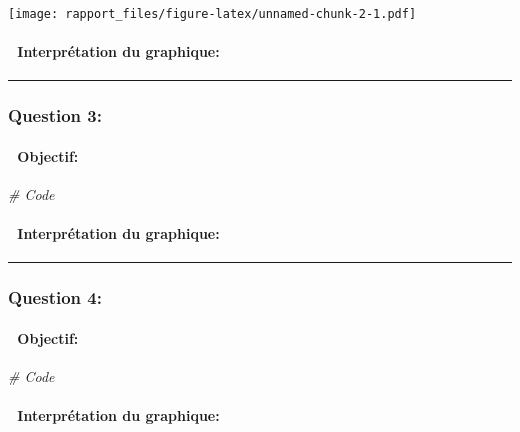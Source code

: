 \documentclass[
]{article}
\newenvironment{Shaded}{\begin{snugshade}}{\end{snugshade}}
\newcommand{\CommentTok}[1]{\textcolor[rgb]{0.56,0.35,0.01}{\textit{#1}}}
\begin{document}
\texttt{[image: rapport\_files/figure-latex/unnamed-chunk-2-1.pdf]}

\paragraph{🧠 Interprétation du
graphique:}\label{interpruxe9tation-du-graphique-1}

\begin{center}\rule{0.5\linewidth}{0.5pt}\end{center}

\subsubsection{\texorpdfstring{\textbf{Question
3:}}{Question 3:}}\label{question-3}

\paragraph{🎯 Objectif:}\label{objectif-2}

\begin{Shaded}
\begin{Highlighting}[]
\CommentTok{\# Code}
\end{Highlighting}
\end{Shaded}

\paragraph{🧠 Interprétation du
graphique:}\label{interpruxe9tation-du-graphique-2}

\begin{center}\rule{0.5\linewidth}{0.5pt}\end{center}

\subsubsection{\texorpdfstring{\textbf{Question
4:}}{Question 4:}}\label{question-4}

\paragraph{🎯 Objectif:}\label{objectif-3}

\begin{Shaded}
\begin{Highlighting}[]
\CommentTok{\# Code}
\end{Highlighting}
\end{Shaded}

\paragraph{🧠 Interprétation du
graphique:}\label{interpruxe9tation-du-graphique-3}
\end{document}
